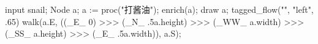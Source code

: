 \usemodule[zhfonts]
\startMPpage
input snail;
Node a;
a := proc("打酱油");
enrich(a);
draw a;
tagged_flow("", "left", .65)
  walk(a.E, ((_E_ 0) >>> (_N_ .5a.height)
  >>> (_WW_ a.width) >>> (_SS_ a.height) >>> (_E_ .5a.width)), a.S);
\stopMPpage
